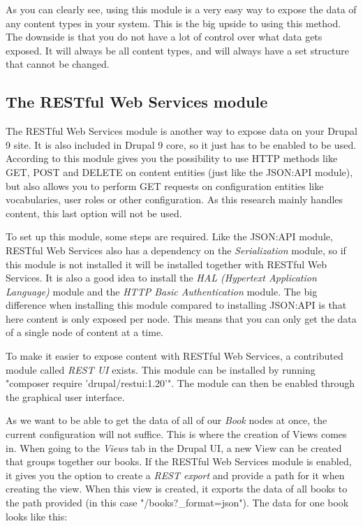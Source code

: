 As you can clearly see, using this module is a very easy way to expose the data of any content types in your system. This is the big upside to using this method. The downside is that you do not have a lot of control over what data gets exposed. It will always be all content types, and will always have a set structure that cannot be changed.


\subsection{The  RESTful Web Services module}

The RESTful Web Services module is another way to expose data on your Drupal 9 site. It is also included in Drupal 9 core, so it just has to be enabled to be used. According to \textcite{So2018} this module gives you the possibility to use HTTP methods like GET, POST and DELETE on content entities (just like the JSON:API module), but also allows you to perform GET requests on configuration entities like vocabularies, user roles or other configuration. As this research mainly handles content, this last option will not be used.


To set up this module, some steps are required. Like the JSON:API module, RESTful Web Services also has a dependency on the \emph{Serialization} module, so if this module is not installed it will be installed together with RESTful Web Services. It is also a good idea to install the \emph{HAL (Hypertext Application Language)} module and the \emph{HTTP Basic Authentication} module. The big difference when installing this module compared to installing JSON:API is that here content is only exposed per node. This means that you can only get the data of a single node of content at a time.

To make it easier to expose content with RESTful Web Services, a contributed module called \emph{REST UI} exists. This module can be installed by running "composer require 'drupal/restui:1.20'". The module can then be enabled through the graphical user interface.

As we want to be able to get the data of all of our \emph{Book} nodes at once, the current configuration will not suffice. This is where the creation of Views comes in. When going to the \emph{Views} tab in the Drupal UI, a new View can be created that groups together our books. If the RESTful Web Services module is enabled, it gives you the option to create a \emph{REST export} and provide a path for it when creating the view. When this view is created, it exports the data of all books to the path provided (in this case "/books?\_format=json"). The data for one book looks like this: 

